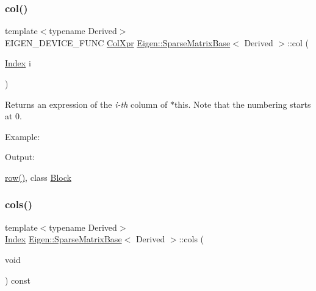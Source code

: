 \subsubsection{\texorpdfstring{col()}{col()}}
{\footnotesize\ttfamily template$<$typename Derived$>$ \\
E\+I\+G\+E\+N\+\_\+\+D\+E\+V\+I\+C\+E\+\_\+\+F\+U\+NC \mbox{\hyperlink{class_eigen_1_1_block}{Col\+Xpr}} \mbox{\hyperlink{class_eigen_1_1_sparse_matrix_base}{Eigen\+::\+Sparse\+Matrix\+Base}}$<$ Derived $>$\+::col (\begin{DoxyParamCaption}\item[{\mbox{\hyperlink{struct_eigen_1_1_eigen_base_a554f30542cc2316add4b1ea0a492ff02}{Index}}}]{i }\end{DoxyParamCaption})\hspace{0.3cm}{\ttfamily [inline]}}

\begin{DoxyReturn}{Returns}
an expression of the {\itshape i-\/th} column of $\ast$this. Note that the numbering starts at 0.
\end{DoxyReturn}
Example\+: 
\begin{DoxyCodeInclude}{0}
\end{DoxyCodeInclude}
 Output\+: 
\begin{DoxyVerbInclude}
\end{DoxyVerbInclude}
 \mbox{\hyperlink{class_eigen_1_1_sparse_matrix_base_ac0a5563ed3f243f013fb9d2c17e230d0}{row()}}, class \mbox{\hyperlink{class_eigen_1_1_block}{Block}} \mbox{\label{class_eigen_1_1_sparse_matrix_base_aca7ce296424ef6e478ab0fb19547a7ee}} 
\subsubsection{\texorpdfstring{cols()}{cols()}}
{\footnotesize\ttfamily template$<$typename Derived$>$ \\
\mbox{\hyperlink{struct_eigen_1_1_eigen_base_a554f30542cc2316add4b1ea0a492ff02}{Index}} \mbox{\hyperlink{class_eigen_1_1_sparse_matrix_base}{Eigen\+::\+Sparse\+Matrix\+Base}}$<$ Derived $>$\+::cols (\begin{DoxyParamCaption}\item[{void}]{ }\end{DoxyParamCaption}) const\hspace{0.3cm}{\ttfamily [inline]}}

